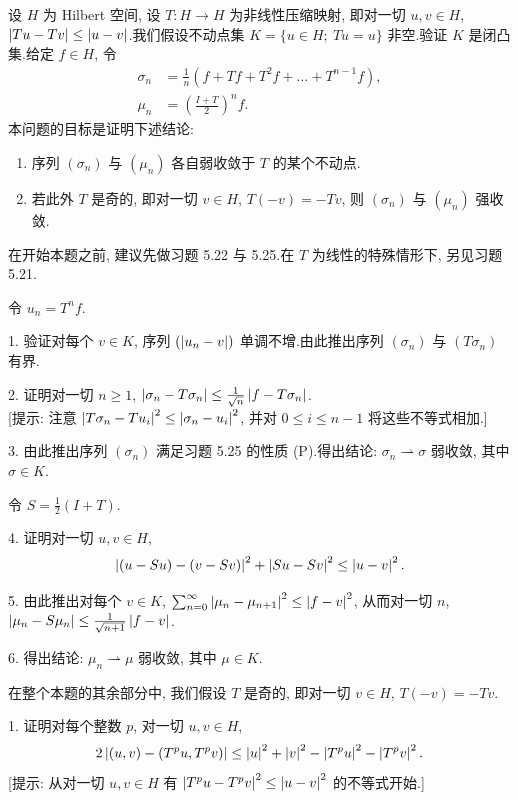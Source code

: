 \begin{problem}
\label{prob:29}
设 $H$ 为 Hilbert 空间, 设 $T:H\to H$ 为非线性压缩映射, 即对一切 $u,v\in H$,
$\left|Tu-Tv\right|\le\left|u-v\right|$.我们假设不动点集 $K=\{u\in H;\ Tu=u\}$ 非空.验证
$K$ 是闭凸集.给定 $f\in H$, 令
\begin{align*}
\sigma_n&=\frac1n(f+Tf+T^2f+\dots+T^{n-1}f),\\
\mu_n&=\left(\frac{I+T}{2}\right)^nf.
\end{align*}
本问题的目标是证明下述结论:
\begin{enumerate}[label=(\Alph*), itemsep=0.1em]
	\item 序列 $(\sigma_n)$ 与 $(\mu_n)$ 各自弱收敛于 $T$ 的某个不动点.
	\item 若此外 $T$ 是奇的, 即对一切 $v\in H$, $T(-v)=-Tv$, 则 $(\sigma_n)$ 与 $(\mu_n)$ 强收敛.
\end{enumerate}
在开始本题之前, 建议先做习题 5.22 与 5.25.在 $T$ 为线性的特殊情形下, 另见习题 5.21.


令 $u_n=T^nf$.

1. 验证对每个 $v\in K$, 序列 $(\left|u_n-v\right|)$ 单调不增.由此推出序列 $(\sigma_n)$
与 $(T\sigma_n)$ 有界.

2. 证明对一切 $n\ge1$, $\left|\sigma_n-T\sigma_n\right|\le\frac{1}{\sqrt{n}}\left|f-T\sigma_n\right|$.\\
{[提示: 注意 $\left|T\sigma_n-Tu_i\right|^2\le\left|\sigma_n-u_i\right|^2$, 并对 $0\le i\le n-1$ 将这些不等式相加.]}

3. 由此推出序列 $(\sigma_n)$ 满足习题 5.25 的性质 (P).得出结论: $\sigma_n\rightharpoonup\sigma$
弱收敛, 其中 $\sigma\in K$.

令 $S=\frac12(I+T)$.

4. 证明对一切 $u,v\in H$,
\begin{equation*}
\left|(u-Su)-(v-Sv)\right|^2+\left|Su-Sv\right|^2\le\left|u-v\right|^2.
\end{equation*}

5. 由此推出对每个 $v\in K$, $\sum_{n=0}^\infty\left|\mu_n-\mu_{n+1}\right|^2\le\left|f-v\right|^2$,
从而对一切 $n$, $\left|\mu_n-S\mu_n\right|\le\frac{1}{\sqrt{n+1}}\left|f-v\right|$.

6. 得出结论: $\mu_n\rightharpoonup\mu$ 弱收敛, 其中 $\mu\in K$.


在整个本题的其余部分中, 我们假设 $T$ 是奇的, 即对一切 $v\in H$, $T(-v)=-Tv$.

1. 证明对每个整数 $p$, 对一切 $u,v\in H$,
\begin{equation*}
2\left|(u,v)-(T^pu,T^pv)\right|\le\left|u\right|^2+\left|v\right|^2-\left|T^pu\right|^2-\left|T^pv\right|^2.
\end{equation*}
[提示: 从对一切 $u,v\in H$ 有 $\left|T^pu-T^pv\right|^2\le\left|u-v\right|^2$ 的不等式开始.]


\end{problem}
